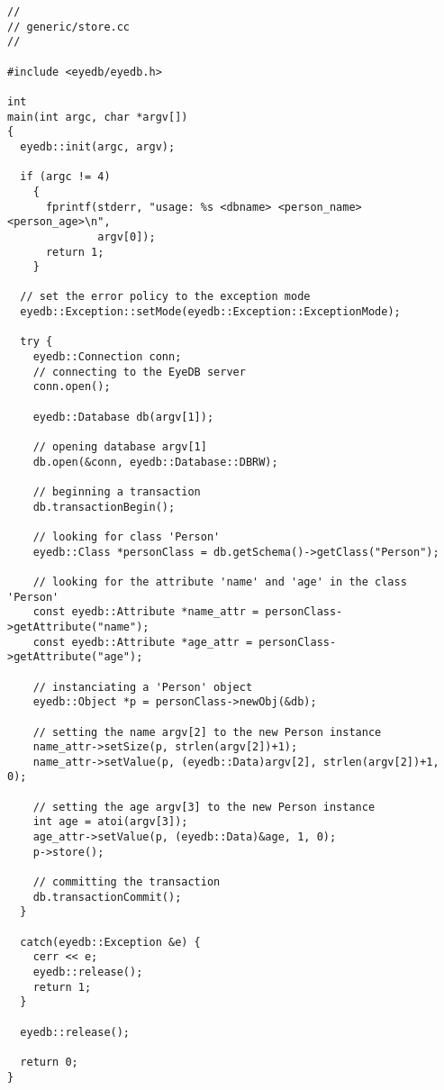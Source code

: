 \begin{verbatim}
//
// generic/store.cc
//

#include <eyedb/eyedb.h>

int
main(int argc, char *argv[])
{
  eyedb::init(argc, argv);

  if (argc != 4)
    {
      fprintf(stderr, "usage: %s <dbname> <person_name> <person_age>\n",
              argv[0]);
      return 1;
    }

  // set the error policy to the exception mode
  eyedb::Exception::setMode(eyedb::Exception::ExceptionMode);

  try {
    eyedb::Connection conn;
    // connecting to the EyeDB server
    conn.open();

    eyedb::Database db(argv[1]);

    // opening database argv[1]
    db.open(&conn, eyedb::Database::DBRW);

    // beginning a transaction
    db.transactionBegin();

    // looking for class 'Person'
    eyedb::Class *personClass = db.getSchema()->getClass("Person");

    // looking for the attribute 'name' and 'age' in the class 'Person'
    const eyedb::Attribute *name_attr = personClass->getAttribute("name");
    const eyedb::Attribute *age_attr = personClass->getAttribute("age");

    // instanciating a 'Person' object
    eyedb::Object *p = personClass->newObj(&db);

    // setting the name argv[2] to the new Person instance
    name_attr->setSize(p, strlen(argv[2])+1);
    name_attr->setValue(p, (eyedb::Data)argv[2], strlen(argv[2])+1, 0);

    // setting the age argv[3] to the new Person instance
    int age = atoi(argv[3]);
    age_attr->setValue(p, (eyedb::Data)&age, 1, 0);
    p->store();

    // committing the transaction
    db.transactionCommit();
  }

  catch(eyedb::Exception &e) {
    cerr << e;
    eyedb::release();
    return 1;
  }

  eyedb::release();

  return 0;
}
\end{verbatim}
\normalsize

